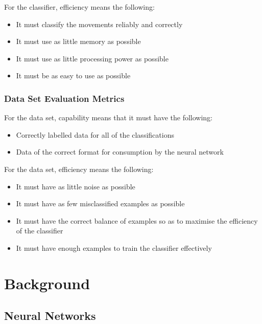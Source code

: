 \documentclass[a4paper]{article}
\begin{document}
For the classifier, efficiency means the following:

\begin{itemize}
\item It must classify the movements reliably and correctly
\item It must use as little memory as possible
\item It must use as little processing power as possible
\item It must be as easy to use as possible
\end{itemize}

\subsubsection{Data Set Evaluation Metrics}

For the data set, capability means that it must have the following:

\begin{itemize}
\item Correctly labelled data for all of the classifications
\item Data of the correct format for consumption by the neural network
\end{itemize}

For the data set, efficiency means the following:

\begin{itemize}
\item It must have as little noise as possible
\item It must have as few misclassified examples as possible
\item It must have the correct balance of examples so as to maximise the efficiency of the classifier
\item It must have enough examples to train the classifier effectively
\end{itemize}

\newpage
\section{Background}

\subsection{Neural Networks}%
\end{document}
